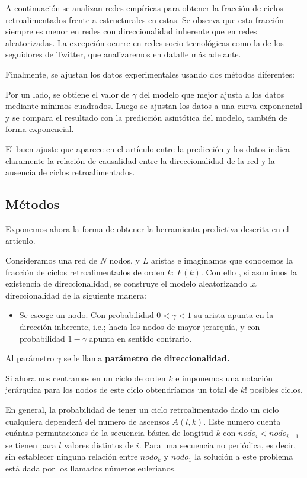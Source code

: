 \documentclass[1p]{elsarticle}
\begin{document}
    A continuación se analizan redes empíricas para obtener la fracción de ciclos retroalimentados frente a estructurales en estas.
    Se observa que esta fracción siempre es menor en redes con direccionalidad inherente que en redes aleatorizadas. 
    La excepción ocurre en redes socio-tecnológicas como la de los seguidores de Twitter, que analizaremos en datalle más adelante.
 
    
    Finalmente, se ajustan los datos experimentales usando dos métodos diferentes:
    
    
    Por un lado, se obtiene el valor de $\gamma$ del modelo que mejor ajusta a los datos mediante mínimos cuadrados.
    Luego se ajustan los datos a una curva exponencial y se compara el resultado con la predicción asintótica del modelo, también de forma exponencial.

    El buen ajuste que aparece en el artículo entre la predicción y los datos indica claramente la relación de causalidad entre la direccionalidad de la red y la ausencia de ciclos retroalimentados.


\subsection{Métodos}
    Exponemos ahora la forma de obtener la herramienta predictiva descrita en el artículo.

    Consideramos una red de $N$ nodos, y $L$ aristas e imaginamos que conocemos la fracción de ciclos retroalimentados de orden $k$: $F(k)$. Con ello , si asumimos la existencia de direccionalidad, se construye el modelo aleatorizando la direccionalidad de la siguiente manera: 
\begin{itemize}
	\item Se escoge un nodo. Con probabilidad $0<\gamma<1$ su arista apunta en la dirección inherente, i.e.; hacia los nodos de mayor jerarquía, y con probabilidad $1-\gamma$ apunta en sentido contrario.
\end{itemize}
Al parámetro $\gamma$ se le llama \textbf{parámetro de direccionalidad.}

Si ahora nos centramos en un ciclo de orden $k$ e imponemos una notación jerárquica para los nodos de este ciclo obtendríamos un total de $k!$ posibles ciclos. 

En general, la probabilidad de tener un ciclo retroalimentado dado un ciclo cualquiera dependerá del numero de ascensos $A(l,k)$.
Este numero cuenta cuántas permutaciones de la secuencia básica de longitud $k$ con $nodo_{i}<nodo_{i+1}$ se tienen para $l$ valores distintos de $i$. Para una secuencia no periódica, es decir, sin establecer ninguna relación entre $nodo_k$ y $nodo_1$
la solución a este problema está dada por los llamados números eulerianos.
\end{document}
